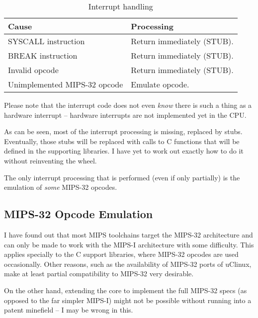     \begin{table}[h]
    \caption{Interrupt handling\label{tab_irq_handling}}
    \begin{tabularx}{\textwidth}{ l|X }
    \toprule
    Cause & Processing \\
    \midrule
    SYSCALL instruction             & Return immediately (STUB). \\
    BREAK instruction               & Return immediately (STUB). \\
    Invalid opcode                  & Return immediately (STUB). \\
    Unimplemented MIPS-32 opcode    & Emulate opcode. \\
    \bottomrule
    \end{tabularx}
    \end{table}       

    Please note that the interrupt code does not even \emph{know} there is
    such a thing as a hardware interrupt -- hardware interrupts are not 
    implemented yet in the CPU.
    
    As can be seen, most of the interrupt processing is missing, replaced by 
    stubs. Eventually, those stubs will be replaced with calls to C functions
    that will be defined in the supporting libraries. I have yet to work out
    exactly how to do it without reinventing the wheel.
    
    The only interrupt processing that is performed (even if only partially) is
    the emulation of \emph{some} MIPS-32 opcodes. 
 
\subsection{MIPS-32 Opcode Emulation}
\label{mips32_opcode_emulation} 
    
    I have found out that most MIPS toolchains target the MIPS-32 architecture 
    and can only be made to work with the MIPS-I architecture with some 
    difficulty. This applies specially to the C support libraries, where 
    MIPS-32 opcodes are used occasionally.
    Other reasons, such as the availability of MIPS-32 ports of
    uClinux, make at least partial compatibility to MIPS-32 very desirable.
    
    On the other hand, extending the core to implement the full MIPS-32 specs (as 
    opposed to the far simpler MIPS-I) might not be possible without running
    into a patent minefield -- I may be wrong in this.
    
